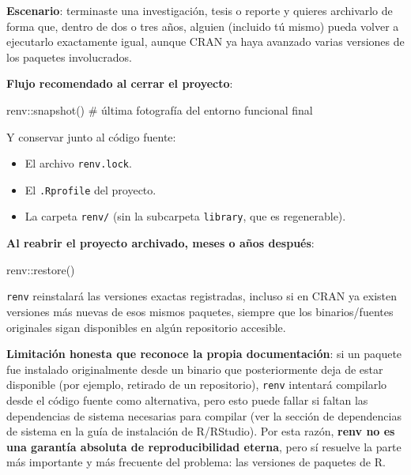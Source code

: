 \documentclass[
  man,
  floatsintext,
  longtable,
  a4paper,
  nolmodern,
  notxfonts,
  notimes,
  12pt,
  colorlinks=true,linkcolor=blue,citecolor=blue,urlcolor=blue]{apa7}
\newenvironment{Shaded}{\begin{snugshade}}{\end{snugshade}}
\newcommand{\CommentTok}[1]{\textcolor[rgb]{0.37,0.37,0.37}{#1}}
\newcommand{\FunctionTok}[1]{\textcolor[rgb]{0.28,0.35,0.67}{#1}}
\newcommand{\NormalTok}[1]{\textcolor[rgb]{0.00,0.23,0.31}{#1}}
\newcommand{\SpecialCharTok}[1]{\textcolor[rgb]{0.37,0.37,0.37}{#1}}
\providecommand{\tightlist}{%
  \setlength{\itemsep}{0pt}\setlength{\parskip}{0pt}}
\begin{document}
\textbf{Escenario}: terminaste una investigación, tesis o reporte y
quieres archivarlo de forma que, dentro de dos o tres años, alguien
(incluido tú mismo) pueda volver a ejecutarlo exactamente igual, aunque
CRAN ya haya avanzado varias versiones de los paquetes involucrados.

\textbf{Flujo recomendado al cerrar el proyecto}:

\begin{Shaded}
\begin{Highlighting}[]
\NormalTok{renv}\SpecialCharTok{::}\FunctionTok{snapshot}\NormalTok{()   }\CommentTok{\# última fotografía del entorno funcional final}
\end{Highlighting}
\end{Shaded}

Y conservar junto al código fuente:

\begin{itemize}
\tightlist
\item
  El archivo \texttt{renv.lock}.
\item
  El \texttt{.Rprofile} del proyecto.
\item
  La carpeta \texttt{renv/} (sin la subcarpeta \texttt{library}, que es
  regenerable).
\end{itemize}

\textbf{Al reabrir el proyecto archivado, meses o años después}:

\begin{Shaded}
\begin{Highlighting}[]
\NormalTok{renv}\SpecialCharTok{::}\FunctionTok{restore}\NormalTok{()}
\end{Highlighting}
\end{Shaded}

\texttt{renv} reinstalará las versiones exactas registradas, incluso si
en CRAN ya existen versiones más nuevas de esos mismos paquetes, siempre
que los binarios/fuentes originales sigan disponibles en algún
repositorio accesible.

\textbf{Limitación honesta que reconoce la propia documentación}: si un
paquete fue instalado originalmente desde un binario que posteriormente
deja de estar disponible (por ejemplo, retirado de un repositorio),
\texttt{renv} intentará compilarlo desde el código fuente como
alternativa, pero esto puede fallar si faltan las dependencias de
sistema necesarias para compilar (ver la sección de dependencias de
sistema en la guía de instalación de R/RStudio). Por esta razón,
\textbf{renv no es una garantía absoluta de reproducibilidad eterna},
pero sí resuelve la parte más importante y más frecuente del problema:
las versiones de paquetes de R.
\end{document}
